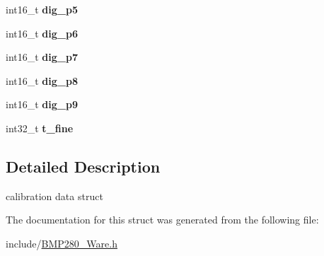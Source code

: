 \begin{DoxyCompactItemize}
int16\+\_\+t {\bfseries dig\+\_\+p5}
\item 
\mbox{\label{structBmp280CalibParam_a60d948c94033428c6b749fdde12ae30f}} 
int16\+\_\+t {\bfseries dig\+\_\+p6}
\item 
\mbox{\label{structBmp280CalibParam_a6aa23c97e1323e8e4edfdb9b0d94a994}} 
int16\+\_\+t {\bfseries dig\+\_\+p7}
\item 
\mbox{\label{structBmp280CalibParam_acc907ae1329f78c0fa8991ae02ed1608}} 
int16\+\_\+t {\bfseries dig\+\_\+p8}
\item 
\mbox{\label{structBmp280CalibParam_af43910766b70a48f4323b2fae0dee380}} 
int16\+\_\+t {\bfseries dig\+\_\+p9}
\item 
\mbox{\label{structBmp280CalibParam_a2b264faa7220fc178a4a255252db43bc}} 
int32\+\_\+t {\bfseries t\+\_\+fine}
\end{DoxyCompactItemize}


\subsection{Detailed Description}
calibration data struct 

The documentation for this struct was generated from the following file\+:\begin{DoxyCompactItemize}
\item 
include/\hyperlink{BMP280__Ware_8h}{B\+M\+P280\+\_\+\+Ware.\+h}\end{DoxyCompactItemize}

